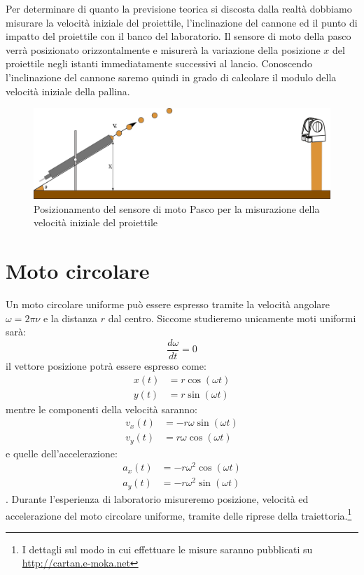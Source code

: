 \documentclass[a4paper,10pt,oneside]{article}
\begin{document}
Per determinare di quanto la previsione teorica si discosta dalla realtà dobbiamo misurare la velocità iniziale del proiettile, l'inclinazione del cannone ed il punto di impatto del proiettile con il banco del laboratorio. 
Il sensore di moto della pasco verrà posizionato orizzontalmente e misurerà la variazione della posizione $x$ del proiettile negli istanti immediatamente successivi al lancio. Conoscendo l'inclinazione del cannone saremo quindi in grado di calcolare il modulo della velocità iniziale della pallina.
\begin{figure}[H]
 \centering
 \includegraphics[width=\textwidth]{./Immagini/cannone5.png}
 \caption{Posizionamento del sensore di moto Pasco per la misurazione della velocità iniziale del proiettile}
 \label{fig:cannone4}
\end{figure}

\section{Moto circolare}

Un moto circolare uniforme può essere espresso tramite la velocità angolare $\omega=2\pi \nu$ e la distanza $r$ dal centro. Siccome studieremo unicamente moti uniformi sarà:
\begin{equation}
 \frac{d\omega}{dt}=0
\end{equation}
il vettore posizione potrà essere espresso come:
\begin{align}
 x(t)&=r\cos(\omega t)\\
y(t)&=r\sin(\omega t)
\end{align}
mentre le componenti della velocità saranno:
\begin{align}
 v_x(t)&=-r\omega\sin(\omega t)\\
v_y(t)&=r\omega\cos(\omega t)
\end{align}
e quelle dell'accelerazione:
\begin{align}
 a_x(t)&=-r\omega^2\cos(\omega t)\\
a_y(t)&=-r\omega^2\sin(\omega t)
\end{align}.
Durante l'esperienza di laboratorio misureremo posizione, velocità ed accelerazione del moto circolare uniforme, tramite delle riprese della traiettoria.\footnote{I dettagli sul modo in cui effettuare le misure saranno pubblicati su \url{http://cartan.e-moka.net}}
\end{document}
